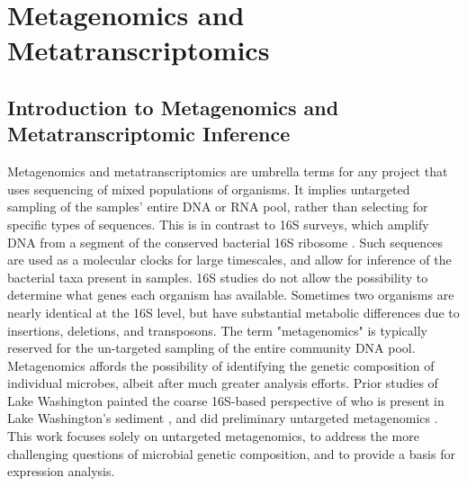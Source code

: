 \section{Metagenomics and Metatranscriptomics}

\subsection{Introduction to Metagenomics and Metatranscriptomic Inference}
Metagenomics and metatranscriptomics are umbrella terms for any project that uses sequencing of mixed populations of organisms.
It implies untargeted sampling of the samples' entire DNA or RNA pool, rather than selecting for specific types of sequences.
This is in contrast to 16S surveys, which amplify DNA from a segment of the conserved bacterial 16S ribosome \cite{kunin2008}.
Such sequences are used as a molecular clocks for large timescales, and allow for inference of the bacterial taxa present in samples.
16S studies do not allow the possibility to determine what genes each organism has available.
Sometimes two organisms are nearly identical at the 16S level, but have substantial metabolic differences due to insertions, deletions, and transposons.  %
The term "metagenomics" is typically reserved for the un-targeted sampling of the entire community DNA pool.
Metagenomics affords the possibility of identifying the genetic composition of individual microbes, albeit after much greater analysis efforts.
Prior studies of Lake Washington painted the coarse 16S-based perspective of who is present in Lake Washington's sediment \cite{beck2013LW, hernandez2015LW, oshkin2015LW}, and did preliminary untargeted metagenomics \cite{beck2013LW, oshkin2015LW}.
This work focuses solely on untargeted metagenomics, to address the more challenging questions of microbial genetic composition, and to provide a basis for expression analysis.

